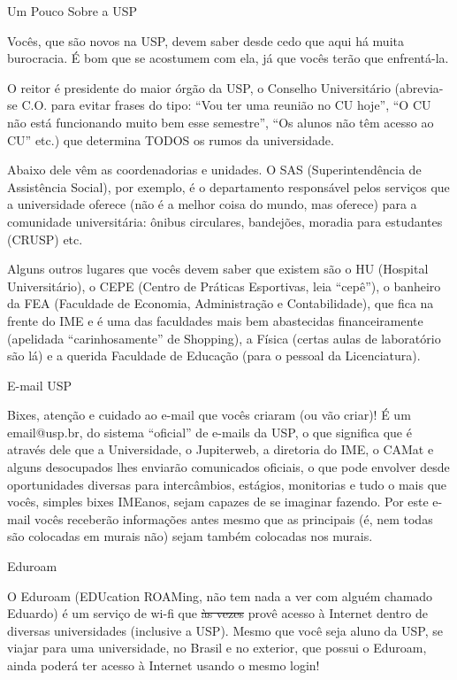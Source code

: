 \begin{secao}{Um Pouco Sobre a USP}

Vocês, que são novos na USP, devem saber desde cedo que aqui há muita
burocracia. É bom que se acostumem com ela, já que vocês terão que enfrentá-la.

O reitor é presidente do maior órgão da USP, o Conselho Universitário (abrevia-se
C.O. para evitar frases do tipo: ``Vou ter uma reunião no CU hoje'', ``O CU não
está funcionando muito bem esse semestre'', ``Os alunos não têm acesso ao CU''
etc.) que determina TODOS os rumos da universidade.

Abaixo dele vêm as coordenadorias e unidades. O SAS (Superintendência de Assistência Social),
por exemplo, é o departamento responsável pelos serviços
que a universidade oferece (não é a melhor coisa do mundo, mas oferece) para a
comunidade universitária: ônibus circulares, bandejões, moradia para estudantes
(CRUSP) etc.

Alguns outros lugares que vocês devem saber que existem são o HU (Hospital
Universitário), o CEPE (Centro de Práticas Esportivas, leia “cepê”), o banheiro
da FEA (Faculdade de Economia, Administração e Contabilidade), que fica na
frente do IME e é uma das faculdades mais bem abastecidas financeiramente
(apelidada “carinhosamente” de Shopping), a Física (certas aulas de laboratório são lá)
 e a querida Faculdade de Educação (para o pessoal da Licenciatura).

\begin{subsecao}{E-mail USP}

Bixes, atenção e cuidado ao e-mail que vocês criaram (ou vão criar)! É um
email@usp.br, do sistema “oficial” de e-mails da USP, o que significa que é
através dele que a Universidade, o Jupiterweb, a diretoria do IME, o CAMat e
alguns desocupados lhes enviarão comunicados oficiais, o que pode envolver desde
oportunidades diversas para intercâmbios, estágios, monitorias e tudo o mais que
vocês, simples bixes IMEanos, sejam capazes de se imaginar fazendo. Por este e-mail
vocês receberão informações antes mesmo que as principais (é, nem todas são
colocadas em murais não) sejam também colocadas nos murais.

\end{subsecao}

\begin{subsecao}{Eduroam}

O Eduroam (EDUcation ROAMing, não tem nada a ver com alguém chamado Eduardo) é um
serviço de wi-fi que \sout{às vezes} provê acesso à Internet dentro de diversas
universidades (inclusive a USP). Mesmo que você seja aluno da USP, se viajar para
uma universidade, no Brasil e no exterior, que possui o Eduroam, ainda poderá ter acesso à Internet
usando o mesmo login!


\end{subsecao}
\end{secao}
